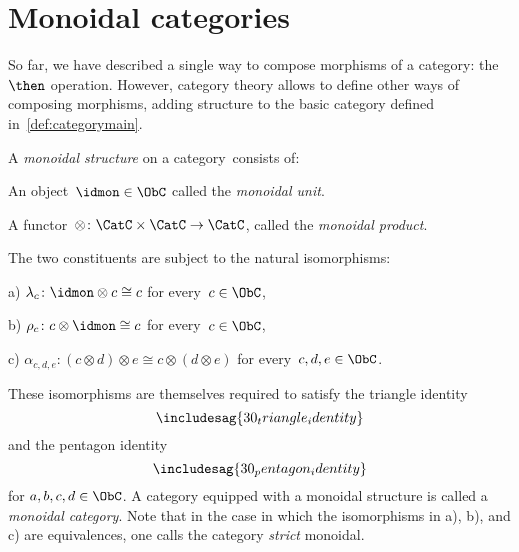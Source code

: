 

\section{Monoidal categories}\label{sec:parallelism-mon-cat}
So far, we have described a single way to compose morphisms of a category: the~$\then$ operation. However, category theory allows to define other ways of composing morphisms, adding structure to the basic category defined in~\cref{def:categorymain}.
\begin{ctdefinition}
  \label{def:monoidal_cat}
  A \emph{monoidal structure} on a category~\CatC consists of:
  \begin{compactenum}
    \item An object~$\idmon\in \ObC$ called the \emph{monoidal unit}.
    \item A functor~$\otimes \colon \CatC \times \CatC\to \CatC$, called the \emph{monoidal product}.
  \end{compactenum}
  The two constituents are subject to the natural isomorphisms:
  \begin{compactenum}
    \item[a)] $\lambda_c \colon \idmon\otimes c \cong c$ for every~$c\in \ObC$,
    \item[b)] $\rho_c \colon c\otimes \idmon \cong c$ for every~$c\in \ObC$,
    \item[c)] $\alpha_{c,d,e}\colon (c\otimes d)\otimes e \cong c\otimes (d\otimes e)$ for every~$c,d,e\in \ObC$.
  \end{compactenum}
  These isomorphisms are themselves required to satisfy the triangle identity
  \begin{equation}
    \includesag{30_triangle_identity}
  \end{equation}
  and the pentagon identity
  \begin{equation}
    \includesag{30_pentagon_identity}
  \end{equation}
  for $a,b,c,d\in \ObC$.
  \noindent A category equipped with a monoidal structure is called a \emph{monoidal category}. Note that in the case in which the isomorphisms in a), b), and c) are equivalences, one calls the category \emph{strict} monoidal.
\end{ctdefinition}

